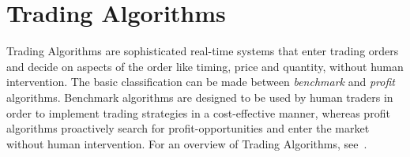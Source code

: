 \section{Trading Algorithms}
\label{Chapters/Background/Trading-Algorithms}
Trading Algorithms are sophisticated real-time systems that enter trading orders and decide on aspects of the order like timing, price and quantity, without human intervention. The basic classification can be made between \textit{benchmark} and \textit{profit} algorithms. Benchmark algorithms are designed to be used by human traders in order to implement trading strategies in a cost-effective manner, whereas profit algorithms proactively search for profit-opportunities and enter the market without human intervention. For an overview of Trading Algorithms, see~\cite{MacKenzie2011}.

